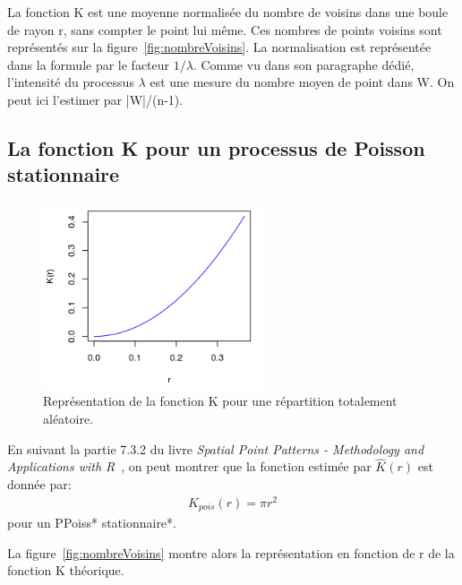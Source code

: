 \documentclass[stage2a]{tnreport}
\begin{document}
La fonction K est une moyenne normalisée du nombre de voisins dans une boule de rayon r, sans compter le point lui même. Ces nombres de points voisins sont représentés sur la figure~\ref{fig:nombreVoisins}. La normalisation est représentée dans la formule par le facteur \begin{math}1/\lambda\end{math}. Comme vu dans son paragraphe dédié,  l'intensité du processus \begin{math}\lambda\end{math} est une mesure du nombre moyen de point dans W. On peut ici l'estimer par |W|/(n-1).\\


\subsection{La fonction K pour un processus de Poisson stationnaire}

\begin{figure}
\vspace{-1.4cm}
\begin{center}
\includegraphics[width=6.5cm]{figures/Kpoiss2.png}
\caption{Représentation de la fonction K pour une répartition totalement aléatoire.}
\label{fig:Kpoiss}
\end{center}
\end{figure} 

En suivant la partie 7.3.2 du livre \textit{Spatial Point Patterns - Methodology and Applications with R}~\cite{BaddEtal16}, on peut montrer que la fonction estimée par \begin{math}\hat{K}(r)\end{math} est donnée par:
\begin{align*} K_{pois}(r) = \pi r^2 \end{align*}
pour un \gls{PPoiss}* \gls{stationnaire}*.

La figure~\ref{fig:nombreVoisins} montre alors la représentation en fonction de r de la fonction K théorique.
\end{document}
